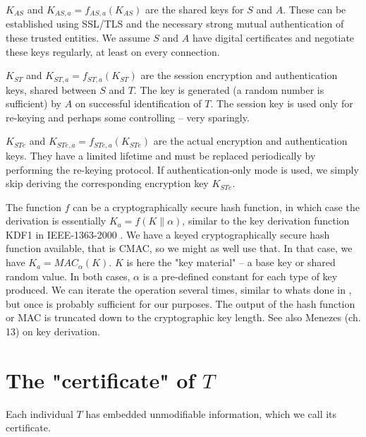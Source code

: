 \documentclass[10pt,a4paper]{article}
\begin{document}
$K_{AS}$ and $K_{AS,a}=f_{AS,a}(K_{AS})$ are the shared keys for $S$ and $A$. These can be established using SSL/TLS and the necessary strong mutual authentication of these trusted entities. We assume $S$ and $A$ have digital certificates and negotiate these keys regularly, at least on every connection.

$K_{ST}$ and $K_{ST,a}=f_{ST,a}(K_{ST})$ are the session encryption and authentication keys, shared between $S$ and $T$. The key is generated (a random number is sufficient) by $A$ on successful identification of $T$. The session key is used only for re-keying and perhaps some controlling -- very sparingly.

$K_{STe}$ and $K_{STe,a}=f_{STe,a}(K_{STe})$ are the actual encryption and authentication keys. They have a limited lifetime and must be replaced periodically by performing the re-keying protocol. If authentication-only mode is used, we simply skip deriving the corresponding encryption key $K_{STe}$.

The function $f$ can be a cryptographically secure hash function, in which case the derivation is essentially $K_a = f(K \parallel \alpha)$, similar to the key derivation function KDF1 in IEEE-1363-2000 \cite{ieee-1363-2000}. We have a keyed cryptographically secure hash function available, that is CMAC, so we might as well use that. In that case, we have $K_a = MAC_{\alpha}(K)$. $K$ is here the "key material" -- a base key or shared random value. In both cases, $\alpha$ is a pre-defined constant for each type of key produced. We can iterate the operation several times, similar to whats done in , but once is probably sufficient for our purposes. The output of the hash function or MAC is truncated down to the cryptographic key length. See also Menezes (ch. 13) on key derivation.


\section{The "certificate" of $T$}

Each individual $T$ has embedded unmodifiable information, which we call its certificate.
\end{document}
